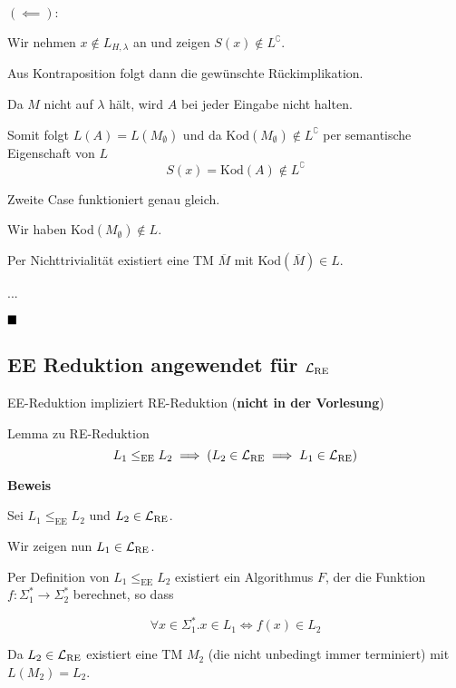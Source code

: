         $\mathbf{(\impliedby):}$
    
        Wir nehmen $x \notin L_{H, \lambda}$ an und zeigen $S(x) \notin L^\complement$. 
    
        Aus Kontraposition folgt dann die gewünschte Rückimplikation.
    
        
        Da $M$ nicht auf $\lambda$ hält, wird $A$ bei jeder Eingabe nicht halten.
    
        
        Somit folgt $L(A) = L(M_{\emptyset})$ und da $\text{Kod}(M_{\emptyset}) \notin L^\complement$ per semantische Eigenschaft von $L$
        $$S(x) = \text{Kod}(A) \notin L^\complement$$
    
    
    

        Zweite Case funktioniert genau gleich.
    
        Wir haben Kod$(M_{\emptyset}) \notin L$. 
        
        Per Nichttrivialität existiert eine TM $\overline{M}$ mit Kod$(\overline{M}) \in L$.
        
        ...
        
        $\hfill\blacksquare$
    
        \subsection{EE Reduktion angewendet für $\mathcal{L}_\text{RE}$}

            EE-Reduktion impliziert RE-Reduktion (\textbf{nicht in der Vorlesung})
            \begin{mainbox}{Lemma zu RE-Reduktion}
                $$L_1 \leq_{\text{EE}} L_2 \implies (L_2 \in \mathcal{L}_\text{RE} \implies L_1 \in \mathcal{L}_\text{RE})$$
            \end{mainbox}
            \textbf{Beweis}
        
            Sei $L_1 \leq_{\text{EE}} L_2$ und $L_2 \in \mathcal{L}_\text{RE}$.
        
            Wir zeigen nun $L_1 \in \mathcal{L}_\text{RE}$.
        
            Per Definition von $L_1 \leq_{\text{EE}} L_2$ existiert ein Algorithmus $F$, 
            der die Funktion $f:\Sigma_1^* \to \Sigma_2^*$ berechnet, so dass
        
            $$\forall x \in \Sigma_1^*. x \in L_1 \iff f(x) \in L_2$$
        
            Da $L_2 \in \mathcal{L}_\text{RE}$ existiert eine TM $M_2$ (die nicht unbedingt immer terminiert) mit $L(M_2) = L_2$.
        
